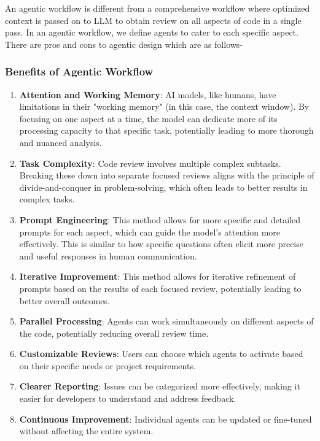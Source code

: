 An agentic workflow is different from a comprehensive workflow where optimized context is passed on to LLM to obtain review on all aspects of code in a single pass. In an agentic workflow, we define agents to cater to each specific aspect. There are pros and cons to agentic design which are as follows-

\subsubsection{Benefits of Agentic Workflow}
\begin{enumerate}
    \item \textbf{Attention and Working Memory}: AI models, like humans, have limitations in their "working memory" (in this case, the context window). By focusing on one aspect at a time, the model can dedicate more of its processing capacity to that specific task, potentially leading to more thorough and nuanced analysis.
    \item \textbf{Task Complexity}: Code review involves multiple complex subtasks. Breaking these down into separate focused reviews aligns with the principle of divide-and-conquer in problem-solving, which often leads to better results in complex tasks.
    \item \textbf{Prompt Engineering}: This method allows for more specific and detailed prompts for each aspect, which can guide the model's attention more effectively. This is similar to how specific questions often elicit more precise and useful responses in human communication.
    \item \textbf{Iterative Improvement}: This method allows for iterative refinement of prompts based on the results of each focused review, potentially leading to better overall outcomes.
    \item \textbf{Parallel Processing}: Agents can work simultaneously on different aspects of the code, potentially reducing overall review time.
    \item \textbf{Customizable Reviews}: Users can choose which agents to activate based on their specific needs or project requirements.
    \item \textbf{Clearer Reporting}: Issues can be categorized more effectively, making it easier for developers to understand and address feedback.
    \item \textbf{Continuous Improvement}: Individual agents can be updated or fine-tuned without affecting the entire system.
\end{enumerate}


